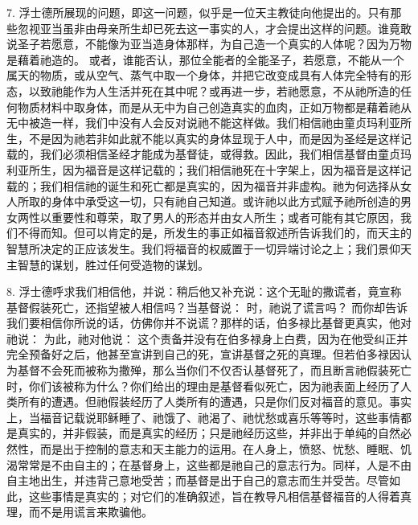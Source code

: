 7. 浮士德所展现的问题，即这一问题，似乎是一位天主教徒向他提出的。只有那些忽视亚当虽非由母亲所生却已死去这一事实的人，才会提出这样的问题。谁竟敢说圣子若愿意，不能像为亚当造身体那样，为自己造一个真实的人体呢？因为万物是藉着祂造的。 或者，谁能否认，那位全能者的全能圣子，若愿意，不能从一个属天的物质，或从空气、蒸气中取一个身体，并把它改变成具有人体完全特有的形态，以致祂能作为人生活并死在其中呢？或再进一步，若祂愿意，不从祂所造的任何物质材料中取身体，而是从无中为自己创造真实的血肉，正如万物都是藉着祂从无中被造一样，我们中没有人会反对说祂不能这样做。我们相信祂由童贞玛利亚所生，不是因为祂若非如此就不能以真实的身体显现于人中，而是因为圣经是这样记载的，我们必须相信圣经才能成为基督徒，或得救。因此，我们相信基督由童贞玛利亚所生，因为福音是这样记载的；我们相信祂死在十字架上，因为福音是这样记载的；我们相信祂的诞生和死亡都是真实的，因为福音并非虚构。祂为何选择从女人所取的身体中承受这一切，只有祂自己知道。或许祂以此方式赋予祂所创造的男女两性以重要性和尊荣，取了男人的形态并由女人所生；或者可能有其它原因，我们不得而知。但可以肯定的是，所发生的事正如福音叙述所告诉我们的，而天主的智慧所决定的正应该发生。我们将福音的权威置于一切异端讨论之上；我们景仰天主智慧的谋划，胜过任何受造物的谋划。\par

8. 浮士德呼求我们相信他，并说：稍后他又补充说：这个无耻的撒谎者，竟宣称基督假装死亡，还指望被人相信吗？当基督说： 时，祂说了谎言吗？ 而你却告诉我们要相信你所说的话，仿佛你并不说谎？那样的话，伯多禄比基督更真实，他对祂说： 为此，祂对他说：  这个责备并没有在伯多禄身上白费，因为在他受纠正并完全预备好之后，他甚至宣讲到自己的死，宣讲基督之死的真理。但若伯多禄因认为基督不会死而被称为撒殚，那么当你们不仅否认基督死了，而且断言祂假装死亡时，你们该被称为什么？你们给出的理由是基督看似死亡，因为祂表面上经历了人类所有的遭遇。但祂假装经历了人类所有的遭遇，只是你们反对福音的意见。事实上，当福音记载说耶稣睡了、祂饿了、祂渴了、祂忧愁或喜乐等等时，这些事情都是真实的，并非假装，而是真实的经历；只是祂经历这些，并非出于单纯的自然必然性，而是出于控制的意志和天主能力的运用。在人身上，愤怒、忧愁、睡眠、饥渴常常是不由自主的；在基督身上，这些都是祂自己的意志行为。同样，人是不由自主地出生，并违背己意地受苦；而基督是出于自己的意志而生并受苦。尽管如此，这些事情是真实的；对它们的准确叙述，旨在教导凡相信基督福音的人得着真理，而不是用谎言来欺骗他。\par

